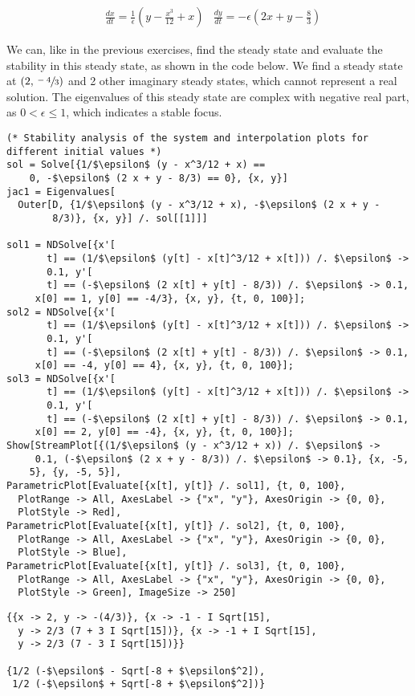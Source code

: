 \documentclass[11pt,a4paper,onecolumn]{article}
\begin{document}
\begin{align*}
  &\frac{dx}{dt} = \frac{1}{\epsilon}(y - \frac{x^3}{12} + x) \nonumber 
  &\frac{dy}{dt} = - \epsilon (2x + y - \frac{8}{3})
\end{align*}

We can, like in the previous exercises, find the steady state and evaluate the stability in this steady state, as shown in the code below. We find a steady state at $(2,\sfrac{-4}{3})$ and 2 other imaginary steady states, which cannot represent a real solution. The eigenvalues of this steady state are complex with negative real part, as $0 < \epsilon \leq 1$, which indicates a stable focus.

\begin{lstlisting}[mathescape]
(* Stability analysis of the system and interpolation plots for different initial values *)
sol = Solve[{1/$\epsilon$ (y - x^3/12 + x) == 
    0, -$\epsilon$ (2 x + y - 8/3) == 0}, {x, y}]
jac1 = Eigenvalues[
  Outer[D, {1/$\epsilon$ (y - x^3/12 + x), -$\epsilon$ (2 x + y - 
        8/3)}, {x, y}] /. sol[[1]]]

sol1 = NDSolve[{x'[
       t] == (1/$\epsilon$ (y[t] - x[t]^3/12 + x[t])) /. $\epsilon$ ->
       0.1, y'[
       t] == (-$\epsilon$ (2 x[t] + y[t] - 8/3)) /. $\epsilon$ -> 0.1,
     x[0] == 1, y[0] == -4/3}, {x, y}, {t, 0, 100}];
sol2 = NDSolve[{x'[
       t] == (1/$\epsilon$ (y[t] - x[t]^3/12 + x[t])) /. $\epsilon$ ->
       0.1, y'[
       t] == (-$\epsilon$ (2 x[t] + y[t] - 8/3)) /. $\epsilon$ -> 0.1,
     x[0] == -4, y[0] == 4}, {x, y}, {t, 0, 100}];
sol3 = NDSolve[{x'[
       t] == (1/$\epsilon$ (y[t] - x[t]^3/12 + x[t])) /. $\epsilon$ ->
       0.1, y'[
       t] == (-$\epsilon$ (2 x[t] + y[t] - 8/3)) /. $\epsilon$ -> 0.1,
     x[0] == 2, y[0] == -4}, {x, y}, {t, 0, 100}];
Show[StreamPlot[{(1/$\epsilon$ (y - x^3/12 + x)) /. $\epsilon$ -> 
     0.1, (-$\epsilon$ (2 x + y - 8/3)) /. $\epsilon$ -> 0.1}, {x, -5,
    5}, {y, -5, 5}],
ParametricPlot[Evaluate[{x[t], y[t]} /. sol1], {t, 0, 100}, 
  PlotRange -> All, AxesLabel -> {"x", "y"}, AxesOrigin -> {0, 0}, 
  PlotStyle -> Red],
ParametricPlot[Evaluate[{x[t], y[t]} /. sol2], {t, 0, 100}, 
  PlotRange -> All, AxesLabel -> {"x", "y"}, AxesOrigin -> {0, 0}, 
  PlotStyle -> Blue], 
ParametricPlot[Evaluate[{x[t], y[t]} /. sol3], {t, 0, 100}, 
  PlotRange -> All, AxesLabel -> {"x", "y"}, AxesOrigin -> {0, 0}, 
  PlotStyle -> Green], ImageSize -> 250]
\end{lstlisting}

\begin{lstlisting}[mathescape]
{{x -> 2, y -> -(4/3)}, {x -> -1 - I Sqrt[15], 
  y -> 2/3 (7 + 3 I Sqrt[15])}, {x -> -1 + I Sqrt[15], 
  y -> 2/3 (7 - 3 I Sqrt[15])}}

{1/2 (-$\epsilon$ - Sqrt[-8 + $\epsilon$^2]), 
 1/2 (-$\epsilon$ + Sqrt[-8 + $\epsilon$^2])} 
\end{lstlisting}
\end{document}

